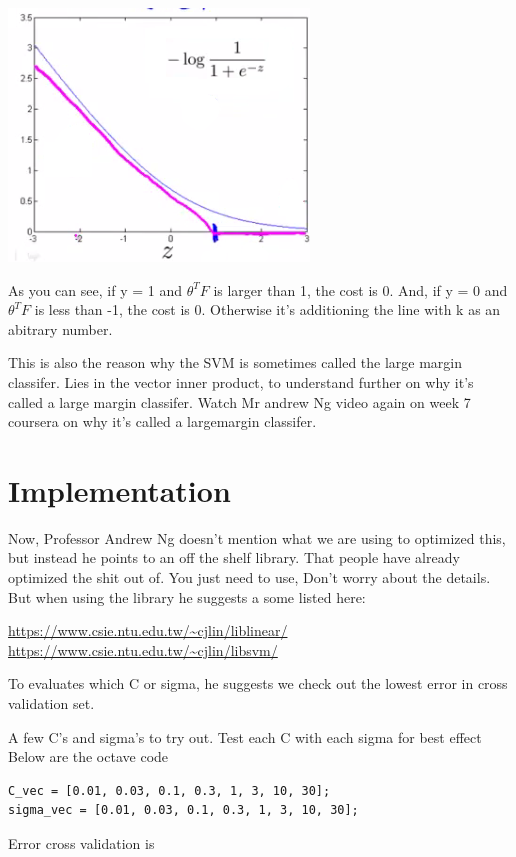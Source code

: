 \documentclass[30pt]{article}
\begin{document}
{\includegraphics[scale=0.9]{cost_1.png}

As you can see, if y = 1 and $\theta^TF$ is larger than 1, the cost is 0.
And, if y = 0 and $\theta^TF$ is less than -1, the cost is 0. Otherwise it's additioning
the line with k as an abitrary number.

This is also the reason why the SVM is sometimes called the large margin classifer.
Lies in the vector inner product, to understand further on why it's called a large
margin classifer. Watch Mr andrew Ng video again on week 7 coursera on why it's 
called a largemargin classifer.

\section{Implementation}
Now, Professor Andrew Ng doesn't mention what we are using to optimized this, but instead
he points to an off the shelf library. That people have already optimized the shit
out of. You just need to use, Don't worry about the details. But when using 
the library he suggests a some listed here:

\url{https://www.csie.ntu.edu.tw/~cjlin/liblinear/}\\
\url{https://www.csie.ntu.edu.tw/~cjlin/libsvm/}

To evaluates which C or sigma, he suggests we check out the lowest error in cross
validation set.

A few C's and sigma's to try out. Test each C with each sigma for best effect
Below are the octave code

\begin{verbatim}
C_vec = [0.01, 0.03, 0.1, 0.3, 1, 3, 10, 30];
sigma_vec = [0.01, 0.03, 0.1, 0.3, 1, 3, 10, 30];
\end{verbatim}

Error cross validation is 

}
\end{document}
